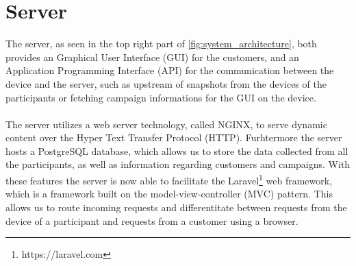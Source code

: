 \section{Server}
\label{sec:server}
The server, as seen in the top right part of \ref{fig:system_architecture}, both provides an Graphical User Interface (GUI) for the customers, and an Application Programming Interface (API) for the communication between the device and the server, such as upstream of snapshots from the devices of the participants or fetching campaign informations for the GUI on the device. 
\\\\
The server utilizes a web server technology, called NGINX, to serve dynamic content over the Hyper Text Transfer Protocol (HTTP). Furhtermore the server hosts a PostgreSQL database, which allows us to store the data collected from all the participants, as well as information regarding customers and campaigns.  
With these features the server is now able to facilitate the Laravel\footnote{https://laravel.com} web framework, which is a framework built on the model-view-controller (MVC) pattern. This allows us to route incoming requests and differentitate between requests from the device of a participant and requests from a customer using a browser. 






